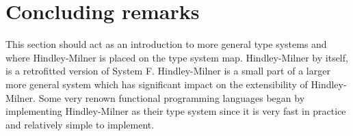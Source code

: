 \section{Concluding remarks}
This section should act as an introduction to more general type systems and where Hindley-Milner is placed on the type system map.
Hindley-Milner by itself, is a retrofitted version of System F.
Hindley-Milner is a small part of a larger more general system which has significant impact on the extensibility of Hindley-Milner.
Some very renown functional programming languages began by implementing Hindley-Milner as their type system since it is very fast in practice and relatively simple to implement.

